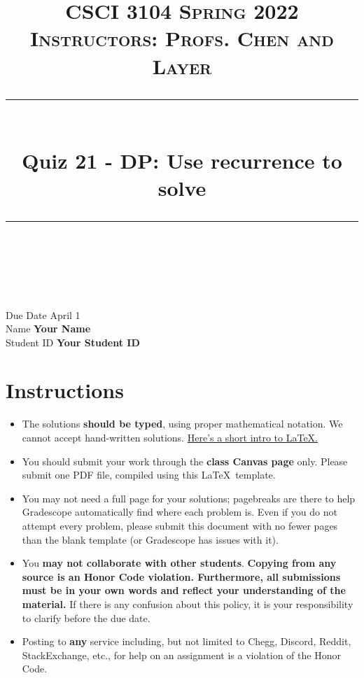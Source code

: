\documentclass[11pt]{article}
\title{
\normalfont \normalsize 
\textsc{CSCI 3104 Spring 2022 \\ 
Instructors: Profs. Chen and Layer} \\
[10pt] 
\rule{\linewidth}{0.5pt} \\[6pt] 
\huge Quiz 21 - DP: Use recurrence to solve \\
\rule{\linewidth}{2pt}  \\[10pt]
}
\date{}
\theoremstyle{definition}
\theoremstyle{definition}
\theoremstyle{definition}
\begin{document}

\maketitle


\noindent
Due Date \dotfill April 1 \\
Name \dotfill \textbf{Your Name} \\
Student ID \dotfill \textbf{Your Student ID} \\


\tableofcontents

\section{Instructions}
 \begin{itemize}
	\item The solutions \textbf{should be typed}, using proper mathematical notation. We cannot accept hand-written solutions. \href{http://ece.uprm.edu/~caceros/latex/introduction.pdf}{Here's a short intro to \LaTeX.}
	\item You should submit your work through the \textbf{class Canvas page} only. Please submit one PDF file, compiled using this \LaTeX \ template.
	\item You may not need a full page for your solutions; pagebreaks are there to help Gradescope automatically find where each problem is. Even if you do not attempt every problem, please submit this document with no fewer pages than the blank template (or Gradescope has issues with it).

	\item You \textbf{may not collaborate with other students}. \textbf{Copying from any source is an Honor Code violation. Furthermore, all submissions must be in your own words and reflect your understanding of the material.} If there is any confusion about this policy, it is your responsibility to clarify before the due date. 

	\item Posting to \textbf{any} service including, but not limited to Chegg, Discord, Reddit, StackExchange, etc., for help on an assignment is a violation of the Honor Code.

\end{itemize}
\end{document}
